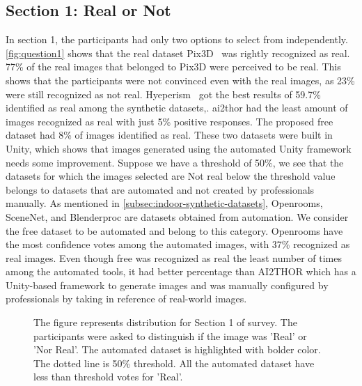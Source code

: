 \subsection{Section 1: Real or Not}
In section 1, the participants had only two options to select from independently.
\autoref{fig:question1} shows that the real dataset Pix3D~\cite{Sun2018} was rightly recognized as real.
77\% of the real images that belonged to Pix3D were perceived to be real.
This shows that the participants were not convinced even with the real images, as 23\% were still recognized as not real.
Hyeperism~\cite{Roberts2020HypersimAP} got the best results of 59.7\% identified as real among the synthetic datasets,.
\gls{ai2thor} had the least amount of images recognized as real with just 5\% positive responses.
The proposed \gls{free} dataset had 8\% of images identified as real.
These two datasets were built in Unity, which shows that images generated using the automated Unity framework needs some improvement.
Suppose we have a threshold of 50\%, we see that the datasets for which the images selected are Not real below the threshold value belongs to datasets that are automated and not created by professionals manually.
As mentioned in \autoref{subsec:indoor-synthetic-datasets}, Openrooms, SceneNet, and Blenderproc are datasets obtained from automation.
We consider the \gls{free} dataset to be automated and belong to this category.
Openrooms have the most confidence votes among the automated images, with 37\% recognized as real images.
Even though \gls{free} was recognized as real the least number of times among the automated tools, it had better percentage than AI2THOR
which has a Unity-based framework to generate images and was manually configured by professionals by taking in reference of real-world images.

\begin{figure}
    \centering
    \resizebox{\textwidth}{!}{}
    \caption{The figure represents distribution for Section 1 of survey. The participants were asked to distinguish if the image was 'Real' or 'Nor Real'.
    The automated dataset is highlighted with bolder color. The dotted line is 50\% threshold. All the automated dataset have less than threshold votes for 'Real'.}
    \label{fig:question1}
\end{figure}

